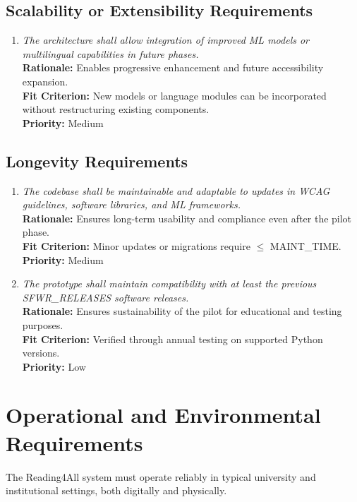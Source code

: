 \documentclass[12pt]{article}
\begin{document}
\subsection{Scalability or Extensibility Requirements}
\begin{enumerate}[label=PR-SER \arabic*., wide=0pt, leftmargin=*]
\item \emph{The architecture shall allow integration of improved ML models or multilingual capabilities in future phases.}\\[2mm] 
    {\bf Rationale:} Enables progressive enhancement and future accessibility expansion.\\
    {\bf Fit Criterion:} New models or language modules can be incorporated without restructuring existing components.\\
    {\bf Priority:} Medium
\end{enumerate}

\subsection{Longevity Requirements}
\begin{enumerate}[label=PR-LR \arabic*., wide=0pt, leftmargin=*]
\item \emph{The codebase shall be maintainable and adaptable to updates in WCAG guidelines, software libraries, and ML frameworks.}\\[2mm] 
    {\bf Rationale:} Ensures long-term usability and compliance even after the pilot phase.\\
    {\bf Fit Criterion:} Minor updates or migrations require $\leq$ MAINT\_TIME.\\
    {\bf Priority:} Medium

\item \emph{The prototype shall maintain compatibility with at least the previous SFWR\_RELEASES software releases.}\\[2mm] 
    {\bf Rationale:} Ensures sustainability of the pilot for educational and testing purposes.\\
    {\bf Fit Criterion:} Verified through annual testing on supported Python versions.\\
    {\bf Priority:} Low
\end{enumerate}
\section{Operational and Environmental Requirements}

The Reading4All system must operate reliably in typical university and institutional settings, both digitally and physically.
\end{document}
